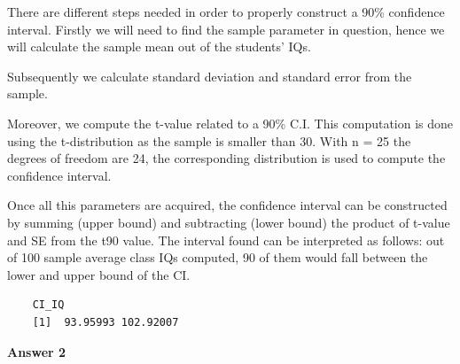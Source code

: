 \documentclass[12pt,letterpaper]{article}
\begin{document}
\noindent There are different steps needed in order to properly construct a 90\% confidence interval. Firstly we will need to find the sample parameter in question, hence we will calculate the sample mean out of the students' IQs.\\
\vspace{.5cm}
  
\vspace{.5cm}
\noindent Subsequently we calculate standard deviation and standard error from the sample. \\
\vspace{.5cm}
 
\vspace{.5cm}
\noindent Moreover, we compute the t-value related to a 90\% C.I. This computation is done using the t-distribution as the sample is smaller than 30. With n = 25 the degrees of freedom are 24, the corresponding distribution is used to compute the confidence interval. \\
\vspace{.5cm}
  
\vspace{.5cm}
\noindent Once all this parameters are acquired, the confidence interval can be constructed by summing (upper bound) and subtracting (lower bound) the product of t-value and SE from the t90 value. The interval found can be interpreted as follows: out of 100 sample average class IQs computed, 90 of them would fall between the lower and upper bound of the CI.\\
\vspace{.5cm}
  
\begin{verbatim}
	CI_IQ
	[1]  93.95993 102.92007
\end{verbatim}
\vspace{.5cm}
\noindent\textbf{Answer 2}\\
\end{document}
